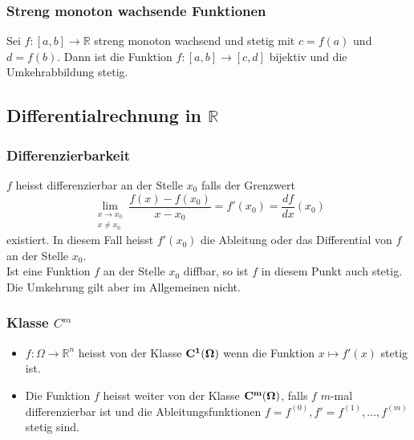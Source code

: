 \documentclass[6pt]{article}
\begin{document}
\begin{multicols*}{3}
\subsubsection*{Streng monoton wachsende Funktionen}
		Sei $f: [a,b] \to \mathbb{R}$ streng monoton wachsend und stetig mit $c = f(a)$ und $d = f(b)$. Dann ist die Funktion $f:[a,b] \to [c,d]$ bijektiv
		und die Umkehrabbildung stetig.


\pagebreak
\subsection*{Differentialrechnung in $\mathbb{R}$}
	
	\subsubsection*{Differenzierbarkeit}
	$f$ heisst differenzierbar an der Stelle $x_0$ falls der Grenzwert
	\begin{equation*}
		\lim_{\substack{x \to x_0 \\ x \neq x_0}} \frac{f(x) - f(x_0)}{x-x_0} = f'(x_0) = \frac{df}{dx}(x_0)
	\end{equation*}
		existiert. In diesem Fall heisst $f'(x_0)$ die Ableitung oder das Differential von $f$ an der Stelle $x_0$.\\
		
		Ist eine Funktion $f$ an der Stelle $x_0$ diffbar, so ist $f$ in diesem Punkt auch stetig. Die Umkehrung gilt aber im Allgemeinen nicht.

	\subsubsection*{Klasse $C^m$}
	\begin{itemize}[itemsep=2pt, parsep=3pt]

		\item 	$f : \Omega \to \mathbb{R}^n$ heisst von der Klasse ${\bf C^1(\Omega)}$ wenn die Funktion $ x \mapsto f'(x)$ stetig ist.
		\item Die Funktion $f$ heisst weiter 
		von der Klasse ${\bf C^m(\Omega)}$, falls $f$ $m$-mal differenzierbar ist und die Ableitungsfunktionen $f = f^{(0)}, f' = f^{(1)}, \ldots, f^{(m)}$ stetig sind.
	\end{itemize}



\end{multicols*}
\end{document}
